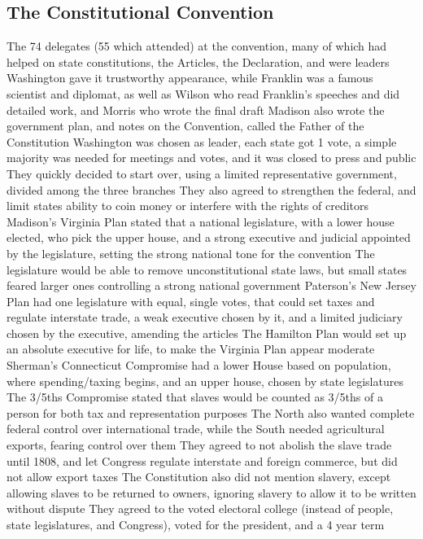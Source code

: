 \documentclass[11 pt, twoside]{article}
\newenvironment{outline*}
{
	\begin{outline}[enumerate]
	}
	{\end{outline}
}
\begin{document}
\subsection{The Constitutional Convention}
\begin{outline*}
\1 The 74 delegates (55 which attended) at the convention, many of which had helped on state constitutions, the Articles, the Declaration, and were leaders
\2 Washington gave it trustworthy appearance, while Franklin was a famous scientist and diplomat, as well as Wilson who read Franklin’s speeches and did detailed work, and Morris who wrote the final draft
\2 Madison also wrote the government plan, and notes on the Convention, called the Father of the Constitution
\1 Washington was chosen as leader, each state got 1 vote, a simple majority was needed for meetings and votes, and it was closed to press and public
\2 They quickly decided to start over, using a limited representative government, divided among the three branches
\2 They also agreed to strengthen the federal, and limit states ability to coin money or interfere with the rights of creditors
\1 Madison’s Virginia Plan stated that a national legislature, with a lower house elected, who pick the upper house, and a strong executive and judicial appointed by the legislature, setting the strong national tone for the convention
\2 The legislature would be able to remove unconstitutional state laws, but small states feared larger ones controlling a strong national government
\1 Paterson’s New Jersey Plan had one legislature with equal, single votes, that could set taxes and regulate interstate trade, a weak executive chosen by it, and a limited judiciary chosen by the executive, amending the articles
\1 The Hamilton Plan would set up an absolute executive for life, to make the Virginia Plan appear moderate
\1 Sherman’s Connecticut Compromise had a lower House based on population, where spending/taxing begins, and an upper house, chosen by state legislatures
\1 The 3/5ths Compromise stated that slaves would be counted as 3/5ths of a person for both tax and representation purposes
\2 The North also wanted complete federal control over international trade, while the South needed agricultural exports, fearing control over them
\2 They agreed to not abolish the slave trade until 1808, and let Congress regulate interstate and foreign commerce, but did not allow export taxes
\1 The Constitution also did not mention slavery, except allowing slaves to be returned to owners, ignoring slavery to allow it to be written without dispute
\2 They agreed to the voted electoral college (instead of people, state legislatures, and Congress), voted for the president, and a 4 year term

\end{outline*}
\end{document}
